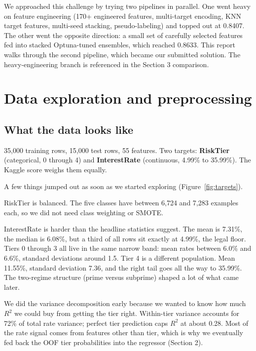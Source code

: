 \documentclass[11pt,a4paper]{article}
\begin{document}
We approached this challenge by trying two pipelines in parallel. One went heavy on feature engineering (170+ engineered features, multi-target encoding, KNN target features, multi-seed stacking, pseudo-labeling) and topped out at 0.8407. The other went the opposite direction: a small set of carefully selected features fed into stacked Optuna-tuned ensembles, which reached 0.8633. This report walks through the second pipeline, which became our submitted solution. The heavy-engineering branch is referenced in the Section 3 comparison.

\section{Data exploration and preprocessing}
\label{sec:eda}

\subsection*{What the data looks like}

35{,}000 training rows, 15{,}000 test rows, 55 features. Two targets: \textbf{RiskTier} (categorical, 0 through 4) and \textbf{InterestRate} (continuous, 4.99\% to 35.99\%). The Kaggle score weighs them equally.

A few things jumped out as soon as we started exploring (Figure~\ref{fig:targets}).

RiskTier is balanced. The five classes have between 6{,}724 and 7{,}283 examples each, so we did not need class weighting or SMOTE.

InterestRate is harder than the headline statistics suggest. The mean is 7.31\%, the median is 6.08\%, but a third of all rows sit exactly at 4.99\%, the legal floor. Tiers 0 through 3 all live in the same narrow band: mean rates between 6.0\% and 6.6\%, standard deviations around 1.5. Tier 4 is a different population. Mean 11.55\%, standard deviation 7.36, and the right tail goes all the way to 35.99\%. The two-regime structure (prime versus subprime) shaped a lot of what came later.

We did the variance decomposition early because we wanted to know how much $R^2$ we could buy from getting the tier right. Within-tier variance accounts for 72\% of total rate variance; perfect tier prediction caps $R^2$ at about 0.28. Most of the rate signal comes from features other than tier, which is why we eventually fed back the OOF tier probabilities into the regressor (Section 2).
\end{document}
